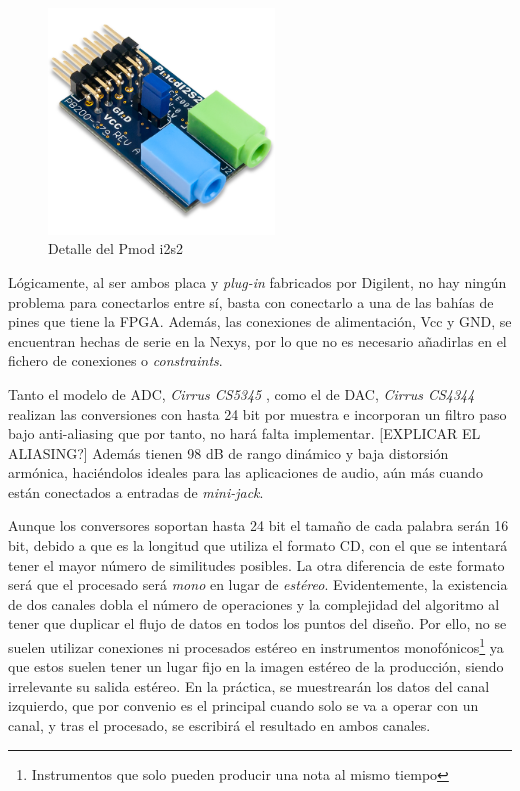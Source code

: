 \begin{figure}[!ht]
\begin{center}
\includegraphics[width=6cm]{img/pmod.png}
\caption{\label{fig:pmod}Detalle del Pmod i2s2}
\end{center}
\end{figure}

Lógicamente, al ser ambos placa y \emph{plug-in} fabricados por Digilent, no hay ningún problema para conectarlos entre sí, basta con conectarlo a una de las bahías de pines que tiene la FPGA. Además, las conexiones de alimentación, Vcc y GND, se encuentran hechas de serie en la Nexys, por lo que no es necesario añadirlas en el fichero de conexiones o \emph{constraints}.

Tanto el modelo de ADC, \emph{Cirrus CS5345} \cite{adcdata}, como el de DAC, \emph{Cirrus CS4344} \cite{dacdata} realizan las conversiones con hasta 24 bit por muestra e incorporan un filtro paso bajo anti-aliasing que por tanto, no hará falta implementar. [EXPLICAR EL ALIASING?] Además tienen 98 dB de rango dinámico y baja distorsión armónica, haciéndolos ideales para las aplicaciones de audio, aún más cuando están conectados a entradas de \emph{mini-jack}.

Aunque los conversores soportan hasta 24 bit el tamaño de cada palabra serán 16 bit, debido a que es la longitud que utiliza el formato CD, con el que se intentará tener el mayor número de similitudes posibles. La otra diferencia de este formato será que el procesado será \emph{mono} en lugar de \emph{estéreo}. Evidentemente, la existencia de dos canales dobla el número de operaciones y la complejidad del algoritmo al tener que duplicar el flujo de datos en todos los puntos del diseño. Por ello, no se suelen utilizar conexiones ni procesados estéreo en instrumentos monofónicos\footnote{Instrumentos que solo pueden producir una nota al mismo tiempo} ya que estos suelen tener un lugar fijo en la imagen estéreo de la producción, siendo irrelevante su salida estéreo. En la práctica, se muestrearán los datos del canal izquierdo, que por convenio es el principal cuando solo se va a operar con un canal, y tras el procesado, se escribirá el resultado en ambos canales.

